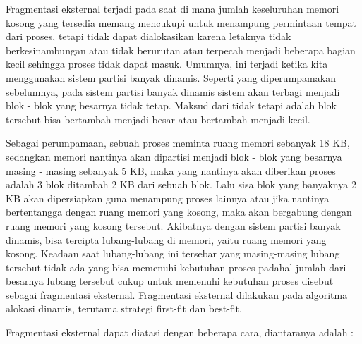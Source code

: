Fragmentasi eksternal terjadi pada saat di mana jumlah keseluruhan memori kosong yang tersedia memang mencukupi untuk menampung permintaan tempat dari proses, tetapi tidak dapat dialokasikan karena letaknya tidak berkesinambungan atau tidak berurutan atau terpecah menjadi beberapa bagian kecil sehingga proses tidak dapat masuk. Umumnya, ini terjadi ketika kita menggunakan sistem partisi banyak dinamis. Seperti yang diperumpamakan sebelumnya, pada sistem partisi banyak dinamis sistem akan terbagi menjadi blok - blok yang besarnya tidak tetap. Maksud dari tidak tetapi adalah blok tersebut bisa bertambah menjadi besar atau bertambah menjadi kecil. 

Sebagai perumpamaan, sebuah proses meminta ruang memori sebanyak 18 KB, sedangkan memori nantinya akan dipartisi menjadi blok - blok yang besarnya masing - masing sebanyak 5 KB, maka yang nantinya akan diberikan proses adalah 3 blok ditambah 2 KB dari sebuah blok. Lalu sisa blok yang banyaknya 2 KB akan dipersiapkan guna menampung proses lainnya atau jika nantinya bertentangga dengan ruang memori yang kosong, maka akan bergabung dengan ruang memori yang kosong tersebut. Akibatnya dengan sistem partisi banyak dinamis, bisa tercipta lubang-lubang di memori, yaitu ruang memori yang kosong. Keadaan saat lubang-lubang ini tersebar yang masing-masing lubang tersebut tidak ada yang bisa memenuhi kebutuhan proses padahal jumlah dari besarnya lubang tersebut cukup untuk memenuhi kebutuhan proses disebut sebagai fragmentasi eksternal. Fragmentasi eksternal dilakukan pada algoritma alokasi dinamis, terutama strategi first-fit dan best-fit.

Fragmentasi eksternal dapat diatasi dengan beberapa cara, diantaranya adalah :

